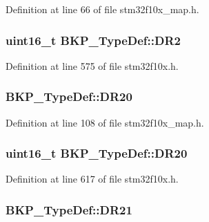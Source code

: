 Definition at line 66 of file stm32f10x\+\_\+map.\+h.

\subsubsection[{\texorpdfstring{D\+R2}{DR2}}]{ {\bf uint16\+\_\+t} B\+K\+P\+\_\+\+Type\+Def\+::\+D\+R2}\hypertarget{struct_b_k_p___type_def_a98d088136a3ba92025a8381d9a19f7b0}{}\label{struct_b_k_p___type_def_a98d088136a3ba92025a8381d9a19f7b0}


Definition at line 575 of file stm32f10x.\+h.

\subsubsection[{\texorpdfstring{D\+R20}{DR20}}]{ B\+K\+P\+\_\+\+Type\+Def\+::\+D\+R20}\hypertarget{struct_b_k_p___type_def_a2ad4f0a0fa68a2ae69ab53ae9ae84015}{}\label{struct_b_k_p___type_def_a2ad4f0a0fa68a2ae69ab53ae9ae84015}


Definition at line 108 of file stm32f10x\+\_\+map.\+h.

\subsubsection[{\texorpdfstring{D\+R20}{DR20}}]{ {\bf uint16\+\_\+t} B\+K\+P\+\_\+\+Type\+Def\+::\+D\+R20}\hypertarget{struct_b_k_p___type_def_a107bde73006459510e9ba42579f6c327}{}\label{struct_b_k_p___type_def_a107bde73006459510e9ba42579f6c327}


Definition at line 617 of file stm32f10x.\+h.

\subsubsection[{\texorpdfstring{D\+R21}{DR21}}]{ B\+K\+P\+\_\+\+Type\+Def\+::\+D\+R21}\hypertarget{struct_b_k_p___type_def_a6a68b095baf20453393de88644c7d0a2}{}\label{struct_b_k_p___type_def_a6a68b095baf20453393de88644c7d0a2}


